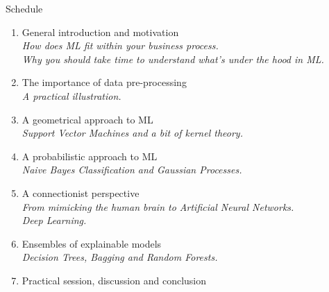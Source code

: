 \documentclass{beamer}
\begin{document}
\begin{frame}{Schedule}
\begin{enumerate}
\item General introduction and motivation \Checkmark \\
{\small \it How does ML fit within your business process.\\
Why you should take time to understand what's under the hood in ML.}
\item The importance of data pre-processing \Checkmark \\
{\small \it A practical illustration.}
\item A geometrical approach to ML\\
{\small \it Support Vector Machines and a bit of kernel theory.}
\item A probabilistic approach to ML\\
{\small \it Naive Bayes Classification and Gaussian Processes.}
\item A connectionist perspective \\
{\small \it From mimicking the human brain to Artificial Neural Networks.\\
Deep Learning.}
\item Ensembles of explainable models\\
{\small \it Decision Trees, Bagging and Random Forests.}
\item Practical session, discussion and conclusion
\end{enumerate}
\end{frame}
\end{document}
